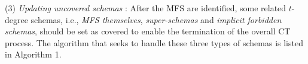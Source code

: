 \documentclass[10pt,journal,compsoc]{IEEEtran}
\begin{document}
%

(3) \emph{Updating uncovered schemas} :
After the MFS are identified, some related $t$-degree schemas, i.e., \emph{MFS themselves}, \emph{super-schemas} and \emph{implicit forbidden schemas}, should be set as covered to enable the termination of the overall CT process. The algorithm that seeks to handle these three types of schemas is listed in Algorithm 1.
\end{document}
